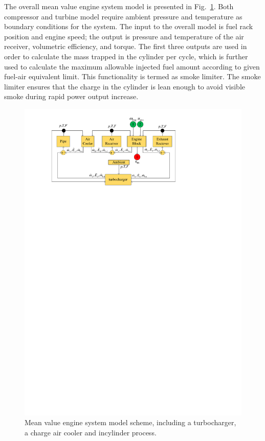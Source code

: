 \documentclass[journal]{IEEEtran}
\begin{document}
The overall mean value engine system model is presented in Fig.~\ref{fig:MVEMscheme}.
Both compressor and turbine model require ambient pressure and temperature as boundary conditions for the system. The input to the overall model is fuel rack position and engine speed; the output is pressure and temperature of the air receiver, volumetric efficiency, and torque.
The first three outputs are used in order to calculate the mass trapped in the cylinder per cycle, which is further used to calculate the maximum allowable injected fuel amount according to given fuel-air equivalent limit. This functionality is termed as smoke limiter. 
The smoke limiter ensures that the charge in the cylinder is lean enough to avoid visible smoke during rapid power output increase. 
\begin{figure}
\normalsize
\centering
\includegraphics[width=\columnwidth,trim=2.75cm 22.5cm 6.5cm 0.8cm]{./figures/MVEMScheme.pdf}
\caption{Mean value engine system model scheme, including a turbocharger, a charge air cooler and incylinder process.}
\label{fig:MVEMscheme}
\end{figure}
\end{document}
